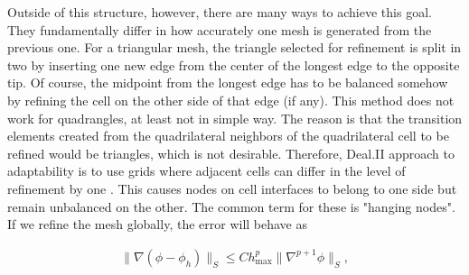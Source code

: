\documentclass[]{pracamgr}
\begin{document}
        Outside of this structure, however, there are many ways to achieve this goal. They fundamentally differ in how accurately one mesh is generated from the previous one. For a triangular mesh, the triangle selected for refinement is split in two by inserting one new edge from the center of the longest edge to the opposite tip. Of course, the midpoint from the longest edge has to be balanced somehow by refining the cell on the other side of that edge (if any). This method does not work for quadrangles, at least not in simple way. The reason is that the transition elements created from the quadrilateral neighbors of the quadrilateral cell to be refined would be triangles, which is not desirable. Therefore, Deal.II approach to adaptability is to use grids where adjacent cells can differ in the level of refinement by one \cite{adaptivemeshdealii}. This causes nodes on cell interfaces to belong to one side but remain unbalanced on the other. The common term for these is "hanging nodes". If we refine the mesh globally, the error will behave as

        \begin{align*}
          \|\nabla(\phi-\phi_h)\|_{S} \le C h_\text{max}^p \| \nabla^{p+1} \phi \|_{S},
        \end{align*}
\end{document}
